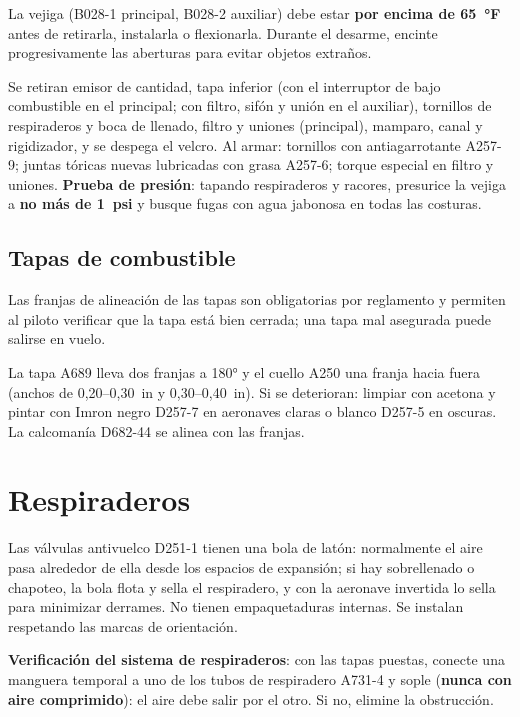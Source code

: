 \begin{precaucion}
La vejiga (B028-1 principal, B028-2 auxiliar) debe estar \textbf{por encima de 65~°F} antes de retirarla, instalarla o flexionarla. Durante el desarme, encinte progresivamente las aberturas para evitar objetos extraños.
\end{precaucion}

Se retiran emisor de cantidad, tapa inferior (con el interruptor de bajo combustible en el principal; con filtro, sifón y unión en el auxiliar), tornillos de respiraderos y boca de llenado, filtro y uniones (principal), mamparo, canal y rigidizador, y se despega el velcro. Al armar: tornillos con antiagarrotante A257-9; juntas tóricas nuevas lubricadas con grasa A257-6; torque especial en filtro y uniones. \textbf{Prueba de presión}: tapando respiraderos y racores, presurice la vejiga a \textbf{no más de 1~psi} y busque fugas con agua jabonosa en todas las costuras.

\subsection{Tapas de combustible}

\begin{advertencia}
Las franjas de alineación de las tapas son obligatorias por reglamento y permiten al piloto verificar que la tapa está bien cerrada; una tapa mal asegurada puede salirse en vuelo.
\end{advertencia}

La tapa A689 lleva dos franjas a 180° y el cuello A250 una franja hacia fuera (anchos de 0,20--0,30~in y 0,30--0,40~in). Si se deterioran: limpiar con acetona y pintar con Imron negro D257-7 en aeronaves claras o blanco D257-5 en oscuras. La calcomanía D682-44 se alinea con las franjas.

\section{Respiraderos}

Las válvulas antivuelco D251-1 tienen una bola de latón: normalmente el aire pasa alrededor de ella desde los espacios de expansión; si hay sobrellenado o chapoteo, la bola flota y sella el respiradero, y con la aeronave invertida lo sella para minimizar derrames. No tienen empaquetaduras internas. Se instalan respetando las marcas de orientación.

\textbf{Verificación del sistema de respiraderos}: con las tapas puestas, conecte una manguera temporal a uno de los tubos de respiradero A731-4 y sople (\textbf{nunca con aire comprimido}): el aire debe salir por el otro. Si no, elimine la obstrucción.

